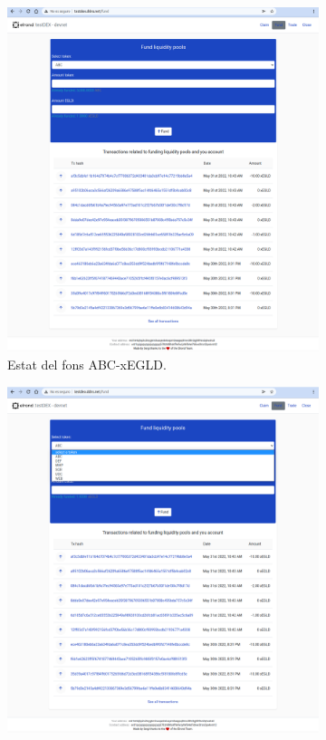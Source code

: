 \documentclass[11pt,a4paper]{article}
\begin{document}
\begin{figure}[!htb]
	\begin{subfigure}[b]{0.47\textwidth}
	  \includegraphics[width=\linewidth]{imp-liqpools1.png}
	  \caption{Estat del fons ABC-xEGLD.}\label{fig:imp-liqpools1}
	\end{subfigure}\hfill
	\begin{subfigure}[b]{0.47\textwidth}
	  \includegraphics[width=\linewidth]{imp-liqpools2.png}

\end{subfigure}
\end{figure}
\end{document}
